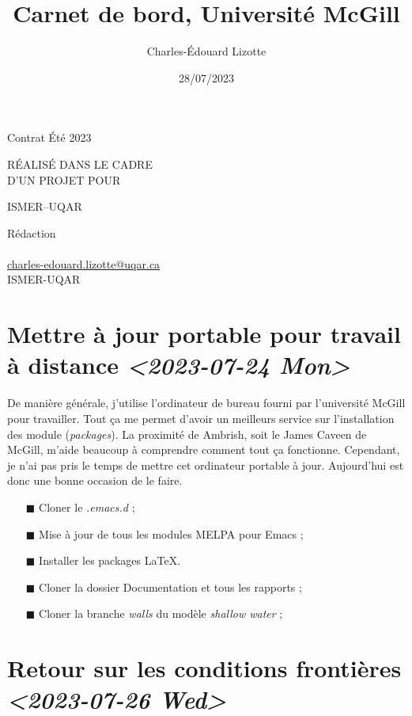 \documentclass[10pt]{article}
\author{Charles-Édouard Lizotte}
\date{28/07/2023}
\title{Carnet de bord, Université McGill}
\makeatletter
\numberwithin{equation}{section}
\renewcommand{\boxtimes}{\blacksquare}
\newcommand{\mytitlepage}{
\begin{titlepage}
\begin{center}
{\Large Contrat Été 2023 \par}
\vspace{2cm}
{\Large \MakeUppercase{\thetitle} \par}
\vspace{2cm}
RÉALISÉ DANS LE CADRE\\ D'UN PROJET POUR \par
\vspace{2cm}
{\Large ISMER--UQAR \par}
\vspace{2cm}
{\thedate}
\end{center}
\vfill
Rédaction \\
{\theauthor}\\
\url{charles-edouard.lizotte@uqar.ca}\\
ISMER-UQAR
\end{titlepage}
}
\makeatother
\begin{document}
\mytitlepage
\tableofcontents\newpage



\section{Mettre à jour portable pour travail à distance  \textit{<2023-07-24 Mon>}}
\label{sec:org1e32711}

De manière générale, j'utilise l'ordinateur de bureau fourni par l'université McGill pour travailler.
Tout ça me permet d'avoir un meilleurs service sur l'installation des module (\emph{packages}).
La proximité de Ambrish, soit le James Caveen de McGill, m'aide beaucoup à comprendre comment tout ça fonctionne.
Cependant, je n'ai pas pris le temps de mettre cet ordinateur portable à jour.
Aujourd'hui est donc une bonne occasion de le faire.
\begin{itemize}
\item[{$\boxtimes$}] Cloner le \emph{.emacs.d} ;
\item[{$\boxtimes$}] Mise à jour de tous les modules MELPA pour Emacs ;
\item[{$\boxtimes$}] Installer les packages \LaTeX{}.
\item[{$\boxtimes$}] Cloner la dossier Documentation et tous les rapports ;
\item[{$\boxtimes$}] Cloner la branche \emph{walls} du modèle \emph{shallow water} ;
\end{itemize}


\section{Retour sur les conditions frontières \textit{<2023-07-26 Wed>}}
\label{sec:orga3b15ef}
\end{document}
